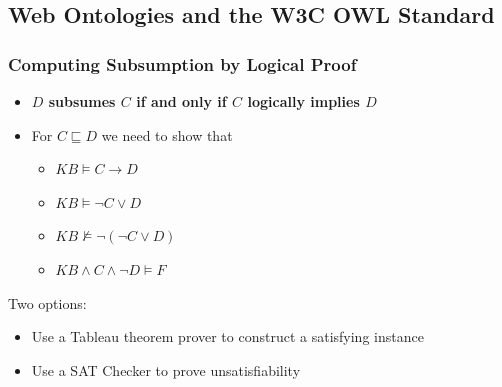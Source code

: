 \documentclass[conference]{styles/acmsiggraph}
\begin{document}
    
    \subsection{Web Ontologies and the W3C OWL Standard}
    
    
    
    
    
    
    
    
        \subsubsection{Computing Subsumption by Logical Proof}
            \begin{itemize}
                \item \textbf{$D$ subsumes $C$ if and only if $C$ logically implies $D$}
                \item For $C \sqsubseteq D$ we need to show that
                    \begin{itemize}
                        \item $KB \vDash C \rightarrow D$
                        \item $KB \vDash \lnot C \vee D$
                        \item $KB \nvDash \lnot (\lnot C \vee D)$
                        \item $KB \wedge C \wedge \lnot D \vDash F$
                    \end{itemize}
            \end{itemize}
            Two options:
            \begin{itemize}
                \item Use a Tableau theorem prover to construct a satisfying instance
                \item Use a SAT Checker to prove unsatisfiability
            \end{itemize}
        
\end{document}
